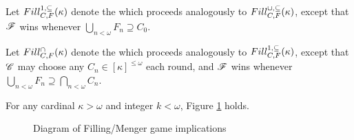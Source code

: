 \begin{game}
  Let $Fill^{1,\subseteq}_{C,F}(\kappa)$ denote the
   which proceeds analogously
  to $Fill^{\cup,\subseteq}_{C,F}(\kappa)$, except that $\mathscr{F}$ wins whenever
  $\bigcup_{n<\omega}F_n\supseteq C_0$.
\end{game}

\begin{game}
  Let $Fill^{\cap}_{C,F}(\kappa)$ denote the
   which proceeds analogously
  to $Fill^{1,\subseteq}_{C,F}(\kappa)$, except that $\mathscr{C}$ may choose any
  $C_n\in[\kappa]^{\leq\omega}$ each round, and $\mathscr{F}$ wins whenever
  $\bigcup_{n<\omega}F_n\supseteq\bigcap_{n<\omega}C_n$.
\end{game}

\begin{thm}
For any cardinal $\kappa>\omega$ and integer $k<\omega$,
Figure \ref{fillingGamesDiagram} holds.
\end{thm}


\begin{figure}[h]\label{fillingGamesDiagram}
\begin{center}
\end{center}
\caption{Diagram of Filling/Menger game implications}
\end{figure}

